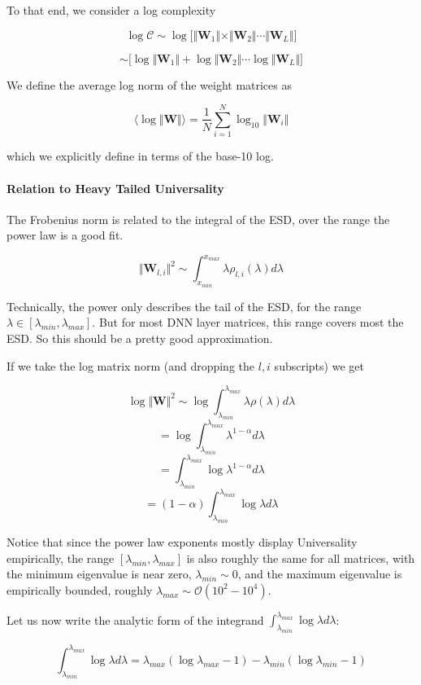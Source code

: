  To that end, we consider a log complexity

$$\log\mathcal{C}\sim\log\bigg[\Vert\mathbf{W}_{1}\Vert\times\Vert\mathbf{W}_{2}\Vert\cdots\Vert\mathbf{W}_{L}\Vert\bigg]$$

$$\sim\bigg[\log\Vert\mathbf{W}_{1}\Vert+\log\Vert\mathbf{W}_{2}\Vert\cdots\log\Vert\mathbf{W}_{L}\Vert\bigg]$$

We define the average log norm of the weight matrices as

$$\langle\log\Vert\mathbf{W}\Vert\rangle=\dfrac{1}{N}\sum_{i=1}^{N}\log_{10}\Vert\mathbf{W}_{i}\Vert$$

which we explicitly define in terms of the base-10 log.

\paragraph{Relation to Heavy Tailed Universality}

The Frobenius norm is related to the integral of the ESD, over the range the power law is a good fit. 

$$\Vert\mathbf{W}_{l,i}\Vert^{2}\sim\int_{x_{min}}^{x_{max}}\lambda\rho_{l,i}(\lambda)d\lambda$$

Technically, the power only describes the tail of the ESD,  for the range $\lambda\in[\lambda_{min},\lambda_{max}]$.
  But for most DNN layer matrices, this range covers most the ESD.  So this should be a pretty good approximation.

If we take the log matrix norm (and dropping the $l,i$ subscripts) we get

$$\log\Vert\mathbf{W}\Vert^{2}\sim\log\int_{\lambda_{min}}^{\lambda_{max}}\lambda\rho(\lambda)d\lambda$$
$$=\log\int_{\lambda_{min}}^{\lambda_{max}}\lambda^{1-\alpha}d\lambda$$
$$=\int_{\lambda_{min}}^{\lambda_{max}}\log\lambda^{1-\alpha}d\lambda$$
$$=(1-\alpha)\int_{\lambda_{min}}^{\lambda_{max}}\log\lambda d\lambda$$

Notice that since the power law exponents mostly display Universality empirically, the range $[\lambda_{min},\lambda_{max}]$ is also roughly the same for all matrices, with the minimum eigenvalue is near zero, $\lambda_{min}\sim 0$, and the maximum eigenvalue is  empirically bounded, roughly $\lambda_{max}\sim\mathcal{O}(10^{2}-10^{4})$.  

Let us now write the analytic form of the integrand $\int_{\lambda_{min}}^{\lambda_{max}}\log\lambda d\lambda$:

$$\int_{\lambda_{min}}^{\lambda_{max}}\log\lambda d\lambda=\lambda_{max}(\log \lambda_{max} - 1)-\lambda_{min}(\log \lambda_{min} - 1)$$


